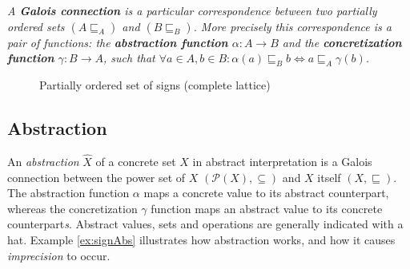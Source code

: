 \begin{definition}
\textit{A \textbf{Galois connection} is a particular correspondence between two partially ordered sets $(A\sqsubseteq_A)$ and $(B\sqsubseteq_B)$. More precisely this correspondence is a pair of functions: the \textbf{abstraction function} $\alpha : A \rightarrow B$ and the \textbf{concretization function} $\gamma : B \rightarrow A$, such that $\forall a \in A, b \in B: \alpha(a) \sqsubseteq_B b \Leftrightarrow a \sqsubseteq_A \gamma(b)$.}
\end{definition}

\begin{figure}
\centering
\caption{Partially ordered set of signs (complete lattice)}
\label{fig:lattice}
\end{figure}

\subsection{Abstraction}
An \textit{abstraction} $\hat{X}$ of a concrete set $X$ in abstract interpretation is a Galois connection between the power set of $X$ $(\mathcal{P}(X),\subseteq)$ and $X$ itself $(X,\sqsubseteq)$. The abstraction function $\alpha$ maps a concrete value to its abstract counterpart, whereas the concretization $\gamma$ function maps an abstract value to its concrete counterpart\textit{s}. Abstract values, sets and operations are generally indicated with a hat. Example \ref{ex:signAbs} illustrates how abstraction works, and how it causes \textit{imprecision} to occur.

